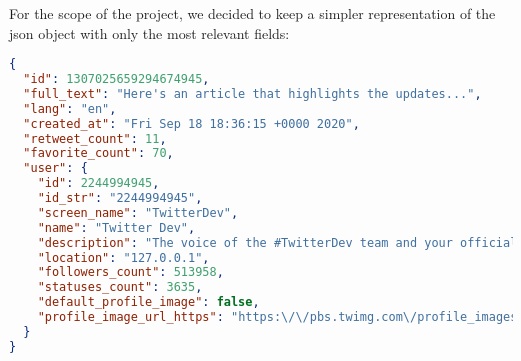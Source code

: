 For the scope of the project, we decided to keep a simpler representation of the json object with only the most relevant fields:

\begin{lstlisting}[language=json, caption={Final json object for a Tweet}, captionpos=b, label={lst:tweet_json}]
{
  "id": 1307025659294674945,
  "full_text": "Here's an article that highlights the updates...",
  "lang": "en",
  "created_at": "Fri Sep 18 18:36:15 +0000 2020",
  "retweet_count": 11,
  "favorite_count": 70,
  "user": {
    "id": 2244994945,
    "id_str": "2244994945",
    "screen_name": "TwitterDev",
    "name": "Twitter Dev",
    "description": "The voice of the #TwitterDev team and your official...",
    "location": "127.0.0.1",
    "followers_count": 513958,
    "statuses_count": 3635,
    "default_profile_image": false,
    "profile_image_url_https": "https:\/\/pbs.twimg.com\/profile_images\/1283786620521652229\/lEODkLTh_normal.jpg"
  }
}
\end{lstlisting}



